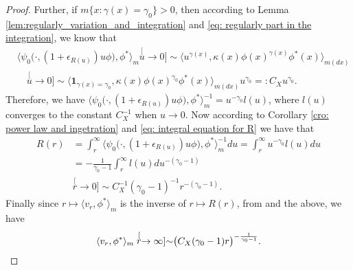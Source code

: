 \documentclass[12pt,a4paper]{amsart}
\theoremstyle{definition}
\numberwithin{equation}{section}
\begin{document}
\begin{proof}
Further, if $m\{x: \gamma(x) = \gamma_0\}> 0$, then according to Lemma \ref{lem:regularly_variation_and_integration} and \eqref{eq: regularly part in the integration}, we know that
\begin{align}
	& \big\langle \psi_0 \big(\cdot,( 1 + \epsilon_{R(u)} ) u \phi \big), \phi^* \big\rangle_m
   \stackrel[u\to 0]{}{\sim}  \langle u^{\gamma(x)} , \kappa (x)\phi(x)^{\gamma(x)} \phi^*(x)
   \rangle_{m(dx)}
	\\ & \quad \stackrel[u\to 0]{}{\sim}  \langle \mathbf 1_{\gamma(x)= \gamma_0}, \kappa (x)\phi(x)^{\gamma_0} \phi^*(x) \rangle_{m(dx)} u^{\gamma_0}
       =: C_X u^{\gamma_0}.
\end{align}
Therefore, we have $\big\langle \psi_0 \big(\cdot,( 1 + \epsilon_{R(u)} ) u \phi \big), \phi^* \big\rangle_m^{-1} = u^{-\gamma_0} l(u)$, where $l(u)$ converges to the constant $C_X^{-1}$ when $u \to 0$.
Now according to Corollary \ref{cro: power law and ingetration} and \eqref{eq: integral equation for R} we have that
\begin{align}
	R(r)
	& = \int_r^\infty \big\langle \psi_0 \big(\cdot,( 1 + \epsilon_{R(u)} ) u \phi \big), \phi^* \big\rangle_m^{-1} du
   = \int_r^\infty u^{-\gamma_0} l(u) du
	\\ & = -\frac{1}{\gamma_0-1}\int_r^\infty l(u) du^{-(\gamma_0 - 1)}
	\\ & \stackrel[r\to 0]{}{\sim} C_X^{-1} (\gamma_0-1)^{-1} r^{-(\gamma_0 - 1)}.
\end{align}
Finally since $r\mapsto \langle v_r,\phi^*\rangle_m$ is the inverse of $r\mapsto R(r)$, from \cite[Proposition 1.5.15.]{BinghamGoldieTeugels1989Regular} and the above, we have
\begin{equation}
	\langle v_r,\phi^*\rangle_m
	\stackrel[r\to \infty]{}{\sim} \big(C_X (\gamma_0-1) r \big)^{-\frac{1}{\gamma_0 - 1}}. 
	\qedhere
\end{equation}
\end{proof}
\end{document}
